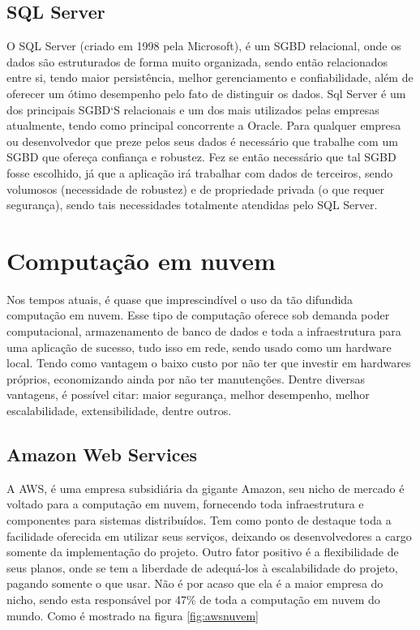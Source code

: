 \subsection{SQL Server}
O SQL Server (criado em 1998 pela Microsoft), é um SGBD relacional, onde os dados são estruturados de forma muito organizada, sendo então relacionados entre si, tendo maior persistência, melhor gerenciamento e confiabilidade, além de oferecer um ótimo desempenho pelo fato de distinguir os dados.
Sql Server é um dos principais SGBD`S relacionais e um dos mais utilizados pelas empresas atualmente, tendo como principal concorrente a Oracle.
Para qualquer empresa ou desenvolvedor que preze pelos seus dados é necessário que trabalhe com um SGBD que ofereça confiança e robustez.
Fez se então necessário que tal SGBD fosse escolhido, já que a aplicação irá trabalhar com dados de terceiros, sendo volumosos (necessidade de robustez) e de propriedade privada (o que requer segurança), sendo tais necessidades totalmente atendidas pelo SQL Server.
\cite{sqlserevralemdoconceito}


\section{Computação em nuvem}
Nos tempos atuais, é quase que imprescindível o uso da tão difundida computação em nuvem.
Esse tipo de computação oferece sob demanda poder computacional, armazenamento de banco de dados e toda a infraestrutura para uma aplicação de sucesso, tudo isso em rede, sendo usado como um hardware local. Tendo como vantagem o baixo custo por não ter que investir em hardwares próprios, economizando ainda por não ter manutenções.
Dentre diversas vantagens, é possível citar: maior segurança, melhor desempenho, melhor escalabilidade, extensibilidade, dentre outros.
\cite{computnuvem}

\subsection{Amazon Web Services}
A AWS, é uma empresa subsidiária da gigante Amazon, seu nicho de mercado é voltado para a computação em nuvem, fornecendo toda infraestrutura e componentes para sistemas distribuídos. Tem como ponto de destaque toda a facilidade oferecida em utilizar seus serviços, deixando os desenvolvedores a cargo somente da implementação do projeto. Outro fator positivo é a flexibilidade de seus planos, onde se tem a liberdade de adequá-los à escalabilidade do projeto, pagando somente o que usar.
Não é por acaso que ela é a maior empresa do nicho, sendo esta responsável por 47\% de toda a computação em nuvem do mundo. Como é mostrado na figura \ref{fig:awsnuvem}
\cite{aws2019}

